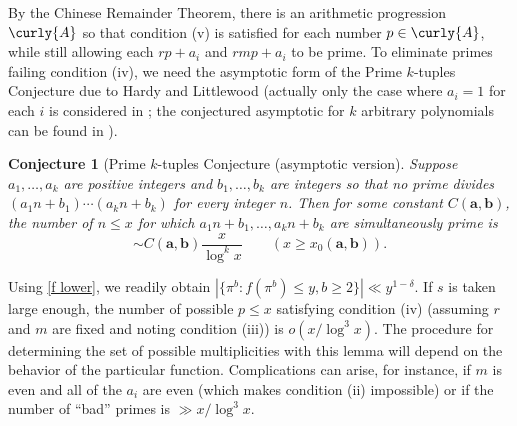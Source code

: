 \documentclass[11pt]{amsart}
\theoremstyle{remark}
\theoremstyle{plain}
\newtheorem{conj}{Conjecture}
\numberwithin{equation}{section}
\newcommand{\del}{\ensuremath{\delta}}
\renewcommand{\(}{\left(}
\renewcommand{\)}{\right)}
\newcommand{\fancyA}{{\curly{A}}}
\renewcommand{\le}{\leqslant}
\renewcommand{\ge}{\geqslant}
\begin{document}
By the Chinese Remainder Theorem, there is an arithmetic progression
$\fancyA$ so that
condition (v) is satisfied for each number $p\in \fancyA$, while still
allowing each $rp+a_i$ and $rmp+a_i$ to be prime.  To eliminate
primes failing condition (iv), we need the asymptotic form of the Prime
$k$-tuples Conjecture due to Hardy and Littlewood \cite{HL} (actually only the
case where $a_i=1$ for each $i$ is considered in \cite{HL}; the conjectured
asymptotic for $k$ arbitrary polynomials can be found in \cite{BHo}).

\begin{conj}[Prime $k$-tuples Conjecture (asymptotic version]
Suppose $a_1, \ldots,
a_k$ are positive integers and $b_1, \ldots, b_k$ are integers so that no
prime divides 
$(a_1 n+b_1) \cdots (a_k n + b_k)$
for every integer $n$.  Then for some constant $C(\mathbf a,\mathbf b)$,
the number of $n\le x$ for which $a_1n+b_1, \ldots ,a_k n + b_k$ are
simultaneously prime is
$$
\sim C(\mathbf a,\mathbf b) \frac{x}{\log^k x} \qquad (x\ge x_0(\mathbf a,
\mathbf b)).
$$
\end{conj}

Using \eqref{f lower}, we readily obtain
$|\{\pi^b: f(\pi^b)\le y,b\ge 2 \}| \ll y^{1-\del}.$
If $s$ is taken large enough, the number of possible $p\le x$ satisfying
condition (iv) (assuming $r$ and $m$ are fixed and noting condition
(iii)) is $o(x/\log^3 x)$.  The procedure for determining the set of
possible multiplicities with
this lemma will depend on the behavior of the particular
function.  Complications can arise, for instance, if $m$ is even and all of
the $a_i$ are even (which makes condition (ii) impossible) or if the number
of ``bad'' primes is $\gg x/\log^3 x$.

\bigskip\bigskip


\end{document}
